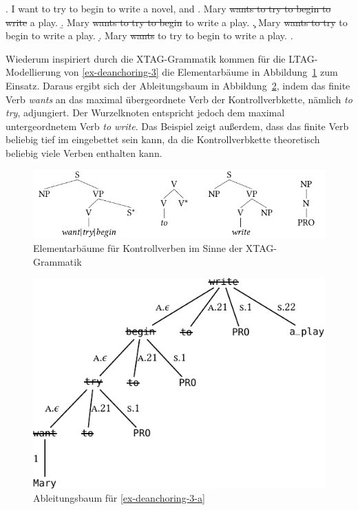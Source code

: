 \ex. \label{ex-deanchoring-3} I want to try to begin to write a novel, and
\a. Mary \sout{wants to try to begin to write} a play.\label{ex-deanchoring-3-a}
\b. Mary \sout{wants to try to begin} to write a play.\label{ex-ross-70-b}
\c. Mary \sout{wants to try} to begin to write a play.\label{ex-ross-70-c}
\d. Mary \sout{wants} to try to begin to write a play.\label{ex-ross-70-d}
\z. \citep[(2-c)]{Ross:70}

Wiederum inspiriert durch die XTAG-Grammatik kommen für die LTAG-Model\-lie\-rung von \ref{ex-deanchoring-3} die Elementarbäume in Abbildung~\ref{fig-deanchoring-4} zum Einsatz. Daraus ergibt sich der Ableitungsbaum in Abbildung~\ref{fig-deanchoring-5}, indem das finite Verb {\it wants} an das maximal übergeordnete Verb der Kontrollverbkette, nämlich {\it to try}, adjungiert. Der Wurzelknoten entspricht jedoch dem maximal untergeordnetem Verb {\it to write}. Das Beispiel zeigt au\ss erdem, dass das finite Verb beliebig tief im  eingebettet sein kann, da die Kontrollverbkette theoretisch beliebig viele Verben enthalten kann.

\begin{figure}[t]
\centering
\includegraphics{graphics/abb817.pdf}
\caption{\label{fig-deanchoring-4}Elementarbäume für Kontrollverben im Sinne der XTAG-Grammatik \citep[Figure~5]{Lichte:Kallmeyer:10}}
\end{figure}

\begin{figure}[t]
\centering
\includegraphics{graphics/abb818.pdf}
\caption{\label{fig-deanchoring-5}Ableitungsbaum für \ref{ex-deanchoring-3-a} \citep[Figure~6]{Lichte:Kallmeyer:10}}
\end{figure}

